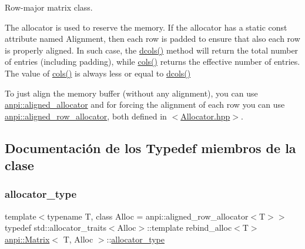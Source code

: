 Row-\/major matrix class.

The allocator is used to reserve the memory. If the allocator has a static const attribute named Alignment, then each row is padded to ensure that also each row is properly aligned. In such case, the \hyperlink{classanpi_1_1Matrix_a594c8611746bd66eb00929cb300d8679}{dcols()} method will return the total number of entries (including padding), while \hyperlink{classanpi_1_1Matrix_a42d956c83ca2f25dba6397b597410c54}{cols()} returns the effective number of entries. The value of \hyperlink{classanpi_1_1Matrix_a42d956c83ca2f25dba6397b597410c54}{cols()} is always less or equal to \hyperlink{classanpi_1_1Matrix_a594c8611746bd66eb00929cb300d8679}{dcols()}

To just align the memory buffer (without any alignment), you can use \hyperlink{classanpi_1_1aligned__allocator}{anpi\+::aligned\+\_\+allocator} and for forcing the alignment of each row you can use \hyperlink{classanpi_1_1aligned__row__allocator}{anpi\+::aligned\+\_\+row\+\_\+allocator}, both defined in $<$\hyperlink{Allocator_8hpp}{Allocator.\+hpp}$>$. 

\subsection{Documentación de los \textquotesingle{}Typedef\textquotesingle{} miembros de la clase}
\mbox{\label{classanpi_1_1Matrix_a3574b7528e3ddfb2f7cdf446be8286c1}} 
\subsubsection{\texorpdfstring{allocator\+\_\+type}{allocator\_type}}
{\footnotesize\ttfamily template$<$typename T, class Alloc = anpi\+::aligned\+\_\+row\+\_\+allocator$<$\+T$>$$>$ \\
typedef std\+::allocator\+\_\+traits$<$Alloc$>$\+::template rebind\+\_\+alloc$<$T$>$ \hyperlink{classanpi_1_1Matrix}{anpi\+::\+Matrix}$<$ T, Alloc $>$\+::\hyperlink{classanpi_1_1Matrix_a3574b7528e3ddfb2f7cdf446be8286c1}{allocator\+\_\+type}}

\mbox{\label{classanpi_1_1Matrix_ac6d45526407ea4455424debdc4f21b91}} 
